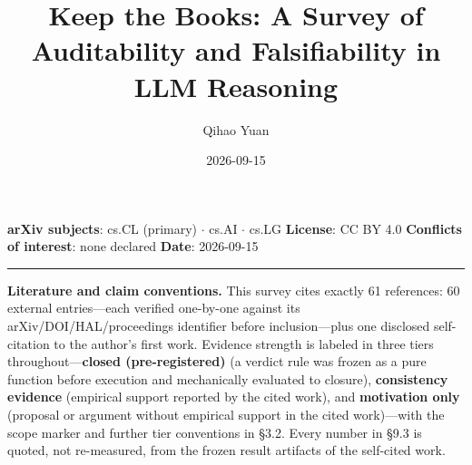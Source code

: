 \documentclass[11pt,a4paper]{article}
\title{Keep the Books: A Survey of Auditability and Falsifiability in LLM Reasoning}
\author{Qihao Yuan}
\date{2026-09-15}
\begin{document}
\maketitle
\thispagestyle{empty}
\vspace{0.5em}
\noindent\textbf{arXiv subjects}: cs.CL (primary) $\cdot$ cs.AI $\cdot$ cs.LG \quad \textbf{License}: CC BY 4.0 \quad \textbf{Conflicts of interest}: none declared \quad \textbf{Date}: 2026-09-15
\vspace{0.5em}
\hrule
\vspace{0.8em}

\noindent \textbf{Literature and claim conventions.} This survey cites exactly 61 references: 60 external entries—each verified one-by-one against its arXiv/DOI/HAL/proceedings identifier before inclusion—plus one disclosed self-citation to the author's first work. Evidence strength is labeled in three tiers throughout—\textbf{closed (pre-registered)} (a verdict rule was frozen as a pure function before execution and mechanically evaluated to closure), \textbf{consistency evidence} (empirical support reported by the cited work), and \textbf{motivation only} (proposal or argument without empirical support in the cited work)—with the scope marker and further tier conventions in §3.2. Every number in §9.3 is quoted, not re-measured, from the frozen result artifacts of the self-cited work.
\end{document}
